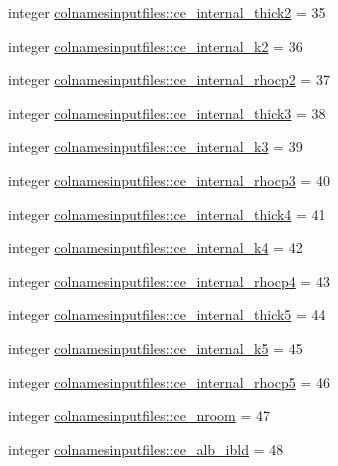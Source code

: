 \begin{DoxyCompactItemize}
\item 
integer \hyperlink{namespacecolnamesinputfiles_ad505e7f33449caafe5d2dd32f66f2772}{colnamesinputfiles\+::ce\+\_\+internal\+\_\+thick2} = 35
\item 
integer \hyperlink{namespacecolnamesinputfiles_a9728065468298189ef5292b3dd006e70}{colnamesinputfiles\+::ce\+\_\+internal\+\_\+k2} = 36
\item 
integer \hyperlink{namespacecolnamesinputfiles_a9796b80c2df6508bc71243ddb0a76714}{colnamesinputfiles\+::ce\+\_\+internal\+\_\+rhocp2} = 37
\item 
integer \hyperlink{namespacecolnamesinputfiles_aa82cab095df0aee6ab3810d139463b12}{colnamesinputfiles\+::ce\+\_\+internal\+\_\+thick3} = 38
\item 
integer \hyperlink{namespacecolnamesinputfiles_aceb4df3d050c89160719c73160ce2cda}{colnamesinputfiles\+::ce\+\_\+internal\+\_\+k3} = 39
\item 
integer \hyperlink{namespacecolnamesinputfiles_a3515c594820c96b260a5c002e4dc61aa}{colnamesinputfiles\+::ce\+\_\+internal\+\_\+rhocp3} = 40
\item 
integer \hyperlink{namespacecolnamesinputfiles_a865378b6c8d636ee64e56ad2234ab0c4}{colnamesinputfiles\+::ce\+\_\+internal\+\_\+thick4} = 41
\item 
integer \hyperlink{namespacecolnamesinputfiles_a77b6ef5e92eaabd3d4218a8de201302c}{colnamesinputfiles\+::ce\+\_\+internal\+\_\+k4} = 42
\item 
integer \hyperlink{namespacecolnamesinputfiles_aa4d07e2c01fd5991a4502bd448d98050}{colnamesinputfiles\+::ce\+\_\+internal\+\_\+rhocp4} = 43
\item 
integer \hyperlink{namespacecolnamesinputfiles_a9b26465fd0e44d505eeba2967606804b}{colnamesinputfiles\+::ce\+\_\+internal\+\_\+thick5} = 44
\item 
integer \hyperlink{namespacecolnamesinputfiles_a448515ea207dd758aae53bd3b8b7604e}{colnamesinputfiles\+::ce\+\_\+internal\+\_\+k5} = 45
\item 
integer \hyperlink{namespacecolnamesinputfiles_a57e4661a3ca89751e4161e0add0fd701}{colnamesinputfiles\+::ce\+\_\+internal\+\_\+rhocp5} = 46
\item 
integer \hyperlink{namespacecolnamesinputfiles_a31500220a4a78b3e50e91b013569210a}{colnamesinputfiles\+::ce\+\_\+nroom} = 47
\item 
integer \hyperlink{namespacecolnamesinputfiles_ac99323dfe4f8220ceeeb6b4ef688912f}{colnamesinputfiles\+::ce\+\_\+alb\+\_\+ibld} = 48
\item 

\end{DoxyCompactItemize}
